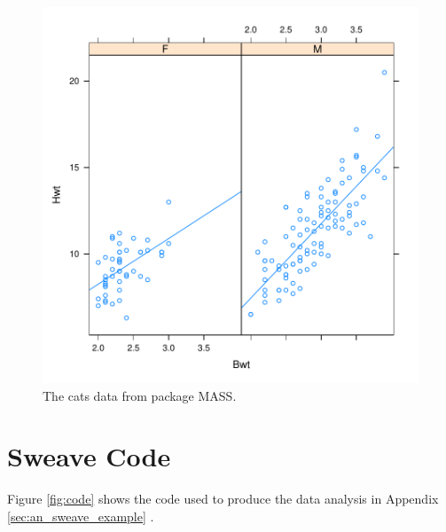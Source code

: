 \documentclass[11pt,article]{memoir}
\begin{document}
\begin{figure}[h!]
  \centering
{} 
\includegraphics{figures/apps-figure}

  \caption{\small The cats data from package MASS.}
  \label{fig:cats}
\end{figure}

 
\chapter{Sweave Code} %
\label{app:sweave_code}

\label{app:sweave-code}
Figure \ref{fig:code} shows the code used to produce the data analysis in Appendix \ref{sec:an_sweave_example} .
\end{document}
